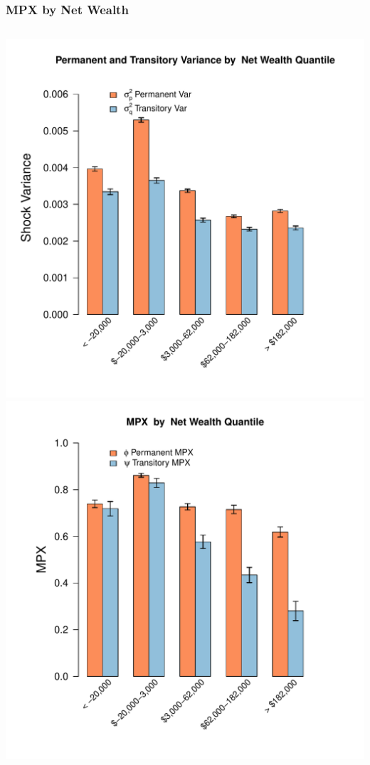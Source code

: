 \documentclass{beamer}
\begin{document}
\frame
{
	\frametitle{MPX by Net Wealth}
	\begin{columns}
		\centering
		\includegraphics[scale=0.35]{../Figures/VarianceByNetWealth_level_lincome_head.pdf}
		\centering
		\includegraphics[scale=0.35]{../Figures/MPXByNetWealth_level_lincome_head.pdf}
	\end{columns} 	
}
\end{document}
